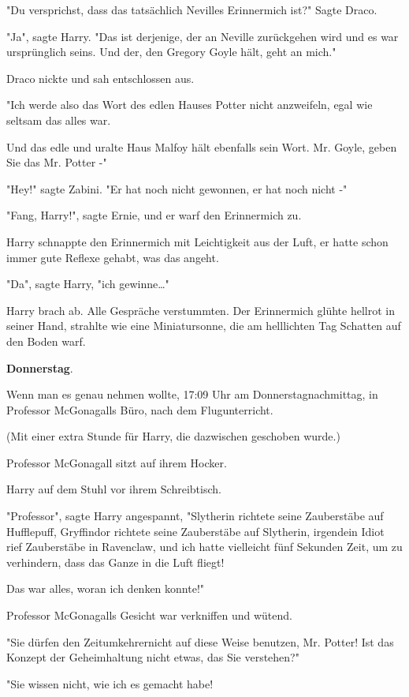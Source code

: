 {"Du versprichst, dass das tatsächlich Nevilles Erinnermich ist?" Sagte Draco.

"Ja", sagte Harry. "Das ist derjenige, der an Neville zurückgehen wird und es war ursprünglich seins. Und der, den Gregory Goyle hält, geht an mich."

Draco nickte und sah entschlossen aus.

"Ich werde also das Wort des edlen Hauses Potter nicht anzweifeln, egal wie seltsam das alles war.

Und das edle und uralte Haus Malfoy hält ebenfalls sein Wort. Mr. Goyle, geben Sie das Mr. Potter -"

"Hey!" sagte Zabini. "Er hat noch nicht gewonnen, er hat noch nicht -"

"Fang, Harry!", sagte Ernie, und er warf den Erinnermich zu.

Harry schnappte den Erinnermich mit Leichtigkeit aus der Luft, er hatte schon immer gute Reflexe gehabt, was das angeht.

"Da", sagte Harry, "ich gewinne…"

Harry brach ab. Alle Gespräche verstummten. Der Erinnermich glühte hellrot in seiner Hand, strahlte wie eine Miniatursonne, die am helllichten Tag Schatten auf den Boden warf.

\textbf{Donnerstag}.

Wenn man es genau nehmen wollte, 17:09 Uhr am Donnerstagnachmittag, in Professor McGonagalls Büro, nach dem Flugunterricht.

(Mit einer extra Stunde für Harry, die dazwischen geschoben wurde.)

Professor McGonagall sitzt auf ihrem Hocker.

Harry auf dem Stuhl vor ihrem Schreibtisch.

"Professor", sagte Harry angespannt, "Slytherin richtete seine Zauberstäbe auf Hufflepuff, Gryffindor richtete seine Zauberstäbe auf Slytherin, irgendein Idiot rief Zauberstäbe in Ravenclaw, und ich hatte vielleicht fünf Sekunden Zeit, um zu verhindern, dass das Ganze in die Luft fliegt!

Das war alles, woran ich denken konnte!"

Professor McGonagalls Gesicht war verkniffen und wütend.

"Sie dürfen den Zeitumkehrernicht auf diese Weise benutzen, Mr. Potter! Ist das Konzept der Geheimhaltung nicht etwas, das Sie verstehen?"

"Sie wissen nicht, wie ich es gemacht habe!

}
